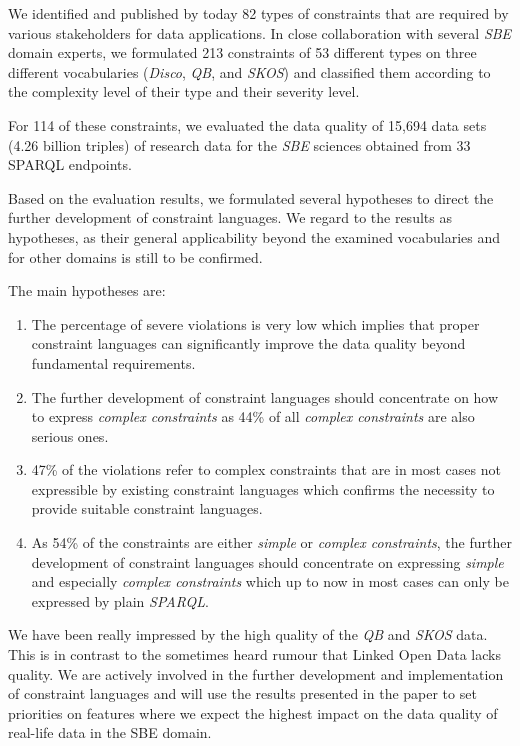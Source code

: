 \documentclass{llncs}
\begin{document}
We identified and published by today 82 types of constraints  that are required by various stakeholders for data applications.
In close collaboration with several \emph{SBE} domain experts, we formulated 213 constraints of 53 different types on three different vocabularies (\emph{Disco}, \emph{QB}, and \emph{SKOS}) and classified them according to the complexity level of their type and their severity level. 

For 114 of these constraints, we evaluated  the data quality of 15,694 data sets (4.26 billion triples) of research data for the \emph{SBE} sciences obtained from 33 SPARQL endpoints.

Based on the evaluation results,
we formulated several hypotheses to direct the further development of constraint languages. We regard to the results as hypotheses, as their general applicability beyond the examined vocabularies and for other domains is still to be confirmed.

The main hypotheses are: 
\begin{enumerate}
	\item The percentage of severe violations is very low which implies that proper constraint languages can significantly improve the data quality beyond fundamental requirements.
  \item The further development of constraint languages should concentrate on how to express \emph{complex constraints} as 44\% of all \emph{complex constraints} are also serious ones.
  \item 47\% of the violations refer to complex constraints that are in most cases not expressible by existing constraint languages which confirms the necessity to provide suitable constraint languages.
  \item As 54\% of the constraints are either \emph{simple} or \emph{complex constraints},
the further development of constraint languages should concentrate on expressing \emph{simple} and especially \emph{complex constraints} which up to now in most cases can only be expressed by plain \emph{SPARQL}. 
\end{enumerate}

We have been really impressed by the high quality of the \emph{QB} and \emph{SKOS} data. This is in contrast to the sometimes heard rumour that Linked Open Data lacks quality. We are actively involved in the further development and implementation of constraint languages and will use the results presented in the paper to set priorities on features where we expect the highest impact on the data quality of real-life data in the SBE domain.

{}

\setcounter{tocdepth}{1}
\end{document}
